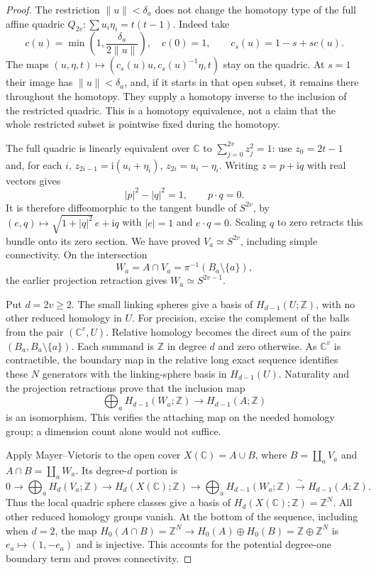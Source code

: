 \begin{proof}
The restriction $\|u\|<\delta_a$ does not change the homotopy type of
the full affine quadric $Q_{2v}:\sum u_i\eta_i=t(t-1)$.
Indeed take
\[
 c(u)=\min\left(1,\frac{\delta_a}{2\|u\|}\right),\quad c(0)=1,
 \qquad c_s(u)=1-s+s c(u).
\]
The maps $(u,\eta,t)\mapsto(c_s(u)u,c_s(u)^{-1}\eta,t)$ stay on the
quadric. At $s=1$ their image has $\|u\|<\delta_a$, and, if it starts
in that open subset, it remains there throughout the homotopy.
They supply a homotopy inverse to the inclusion of the restricted
quadric. This is a homotopy equivalence, not a claim that the whole
restricted subset is pointwise fixed during the homotopy.

The full quadric is linearly equivalent over $\mathbb C$ to
$\sum_{j=0}^{2v}z_j^2=1$: use $z_0=2t-1$ and, for each $i$,
$z_{2i-1}=\mathrm i(u_i+\eta_i)$, $z_{2i}=u_i-\eta_i$.
Writing $z=p+\mathrm i q$ with real vectors gives
\[
 |p|^2-|q|^2=1,\qquad p\cdot q=0.
\]
It is therefore diffeomorphic to the tangent bundle of $S^{2v}$,
by $(e,q)\mapsto\sqrt{1+|q|^2}\,e+\mathrm i q$ with
$|e|=1$ and $e\cdot q=0$. Scaling $q$ to zero retracts this bundle
onto its zero section. We have proved $V_a\simeq S^{2v}$, including
simple connectivity. On the intersection
\[
             W_a=A\cap V_a=\pi^{-1}(B_a\setminus\{a\}),
\]
the earlier projection retraction gives $W_a\simeq S^{2v-1}$.

Put $d=2v\geq2$. The small linking spheres give a basis of
$H_{d-1}(U;\mathbb Z)$, with no other reduced homology in $U$.
For precision, excise the complement of the balls from the pair
$(\mathbb C^v,U)$. Relative homology becomes the direct sum of the
pairs $(B_a,B_a\setminus\{a\})$. Each summand is $\mathbb Z$ in
degree $d$ and zero otherwise. As $\mathbb C^v$ is contractible,
the boundary map in the relative long exact sequence identifies
these $N$ generators with the linking-sphere basis in $H_{d-1}(U)$.
Naturality and the projection retractions prove that the inclusion
map
\[
     \bigoplus_a H_{d-1}(W_a;\mathbb Z)
                 \longrightarrow H_{d-1}(A;\mathbb Z)
\]
is an isomorphism. This verifies the attaching map on the needed
homology group; a dimension count alone would not suffice.

Apply Mayer--Vietoris to the open cover $X(\mathbb C)=A\cup B$,
where $B=\coprod_a V_a$ and $A\cap B=\coprod_a W_a$.
Its degree-$d$ portion is
\[
 0\longrightarrow\bigoplus_a H_d(V_a;\mathbb Z)
    \longrightarrow H_d(X(\mathbb C);\mathbb Z)
    \longrightarrow\bigoplus_a H_{d-1}(W_a;\mathbb Z)
    \xrightarrow{\ \sim\ }H_{d-1}(A;\mathbb Z).
\]
Thus the local quadric sphere classes give a basis of
$H_d(X(\mathbb C);\mathbb Z)=\mathbb Z^N$.
All other reduced homology groups vanish. At the bottom of the
sequence, including when $d=2$, the map
$H_0(A\cap B)=\mathbb Z^N\to H_0(A)\oplus H_0(B)=\mathbb Z\oplus\mathbb Z^N$
is $e_a\mapsto(1,-e_a)$ and is injective. This accounts for the
potential degree-one boundary term and proves connectivity.


\end{proof}
